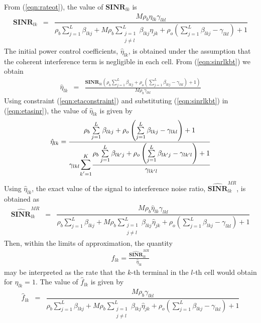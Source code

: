 \documentclass[10pt, a4paper, twoside,fleqn]{article}
\begin{document}
From (\ref{eqn:rateot}), the value of $\pmb{SINR}_{lk}$ is
\begin{eqnarray}\label{eqn:sinrlkbt}
\pmb{SINR}_{lk} &=& \dfrac{M\rho_b\eta_{lk}\gamma_{lkl}}{ \rho_b\sum\limits_{j=1}^{L}\beta_{lkj}+M\rho_b\sum\limits_{\substack{j=1 \\ j \neq l}}^{L}\beta_{lkj}\eta_{jk} +\rho_o\left(\sum\limits_{j=1}^{L}\beta_{lkj} -\gamma_{lkl}\right)+1}
\end{eqnarray}
 The initial power control coefficients, $\hat \eta_{lk}$, is obtained under the assumption that the coherent interference term is negligible in each cell. From (\ref{eqn:sinrlkbt}) we obtain
 \begin{eqnarray}\label{eqn:etasinr}
 \hat \eta_{lk} &=& \frac{\pmb{SINR}_{lk}\left(\rho_b\sum\limits_{j=1}^{L}\beta_{lkj}+\rho_o\left(\sum\limits_{j=1}^{L}\beta_{lkj} -\gamma_{lkl}\right)+1\right)}{M\rho_b\gamma_{lkl}}
 \end{eqnarray}
 Using constraint (\ref{eqn:etaconstraint}) and substituting (\ref{eqn:sinrlkbt}) in (\ref{eqn:etasinr}), the value of  $\hat \eta_{lk}$ is given by
\begin{eqnarray}\label{eqn:etahatbt}
    \hat \eta_{lk} = \dfrac{\rho_b\sum\limits_{j=1}^{L}\beta_{lkj}+\rho_o\left(\sum\limits_{j=1}^{L}\beta_{lkj} -\gamma_{lkl}\right)+1}
    {\gamma_{lkl}\mathlarger{\mathlarger{\sum}}\limits_{k'=1}^{K}\cfrac{\rho_b\sum\limits_{j=1}^{L}\beta_{lk'j}+\rho_o\left(\sum\limits_{j=1}^{L}\beta_{lk'j} -\gamma_{lk'l}\right)+1}{\gamma_{lk'l}}}
\end{eqnarray}
Using $\hat \eta_{lk}$, the exact value of the signal to interference noise ratio, $\pmb{\widehat{SINR}}_{lk}^{MR}$, is obtained as
\begin{eqnarray}
\pmb{\widehat{SINR}}_{lk}^{MR} &=& \dfrac{M\rho_b\hat\eta_{lk}\gamma_{lkl}}{ \rho_b\sum\limits_{j=1}^{L}\beta_{lkj}+M\rho_b\sum\limits_{\substack{j=1 \\ j \neq l}}^{L}\beta_{lkj}\hat\eta_{jk} +\rho_o\left(\sum\limits_{j=1}^{L}\beta_{lkj} -\gamma_{lkl}\right)+1}
\end{eqnarray}
Then, within the limits of approximation, the quantity
\begin{eqnarray}\label{eqn:flk}
\hat f_{lk} = \frac{\pmb{\widehat{SINR}}_{lk}^{MR}}{\hat \eta_{lk}} 
\end{eqnarray}
may be interpreted as the rate that the $k$-th terminal in the $l$-th cell would obtain for $\eta_{lk}=1$. 
The value of $\hat f_{lk}$ is given by
\begin{eqnarray}
\hat f_{lk} &=& \dfrac{M\rho_b\gamma_{lkl}}{ \rho_b\sum\limits_{j=1}^{L}\beta_{lkj}+M\rho_b\sum\limits_{\substack{j=1 \\ j \neq l}}^{L}\beta_{lkj}\hat\eta_{jk} +\rho_o\left(\sum\limits_{j=1}^{L}\beta_{lkj} -\gamma_{lkl}\right)+1}
\end{eqnarray}
\end{document}
